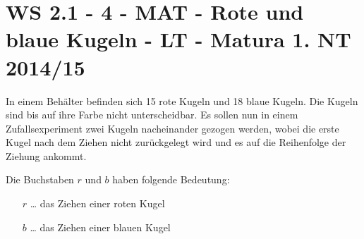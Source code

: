 \section{WS 2.1 - 4 - MAT - Rote und blaue Kugeln - LT - Matura 1. NT 2014/15}

\begin{beispiel}[WS 2.1]{1}
In einem Behälter befinden sich 15 rote Kugeln und 18 blaue Kugeln. Die Kugeln sind bis auf ihre Farbe nicht unterscheidbar. Es sollen nun in einem Zufallsexperiment zwei Kugeln nacheinander gezogen werden, wobei die erste Kugel nach dem Ziehen nicht zurückgelegt wird und es auf die Reihenfolge der Ziehung ankommt. \leer

Die Buchstaben $r$ und $b$ haben folgende Bedeutung:
\begin{itemize}
	\item[$r$ \ldots] das Ziehen einer roten Kugel
	\item[$b$ \ldots] das Ziehen einer blauen Kugel
\end{itemize}

\end{beispiel}